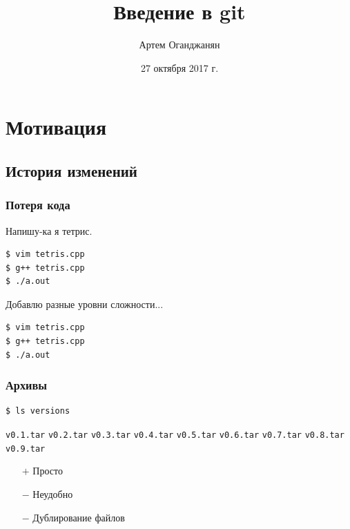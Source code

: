\documentclass[pdf,russian]{beamer}
\title{Введение в git}
\author{Артем Оганджанян}
\institute{CSC}
\date{27 октября 2017 г.}
\begin{document}

\begin{frame}
    \titlepage
\end{frame}

\section{Мотивация}

\subsection{История изменений}

\begin{frame}[fragile]
    \frametitle{Потеря кода}
    \pause
    Напишу-ка я тетрис.
    \begin{block}{}
        \begin{verbatim}
$ vim tetris.cpp
$ g++ tetris.cpp
$ ./a.out
        \end{verbatim}
    \end{block}
    \pause
    Добавлю разные уровни сложности...
    \begin{block}{}
        \begin{verbatim}
$ vim tetris.cpp
$ g++ tetris.cpp
$ ./a.out
        \end{verbatim}
    \end{block}
    \pause
\end{frame}

\begin{frame}[fragile]
    \frametitle{Архивы}
    \begin{block}{}
        \begin{verbatim}
$ ls versions
        \end{verbatim}
        \texttt{\textcolor[HTML]{aa0000}{v0.1.tar}} \quad
        \texttt{\textcolor[HTML]{aa0000}{v0.2.tar}} \quad
        \pause
        \texttt{\textcolor[HTML]{aa0000}{v0.3.tar}} \quad
        \texttt{\textcolor[HTML]{aa0000}{v0.4.tar}} \quad
        \texttt{\textcolor[HTML]{aa0000}{v0.5.tar}} \quad
        \texttt{\textcolor[HTML]{aa0000}{v0.6.tar}} \quad
        \texttt{\textcolor[HTML]{aa0000}{v0.7.tar}} \quad
        \texttt{\textcolor[HTML]{aa0000}{v0.8.tar}} \quad
        \texttt{\textcolor[HTML]{aa0000}{v0.9.tar}}
    \end{block}
    \begin{itemize}
        \pause
        \item[$+$] Просто
        \pause
        \item[$-$] Неудобно
        \pause
        \item[$-$] Дублирование файлов
    \end{itemize}
\end{frame}
\end{document}
